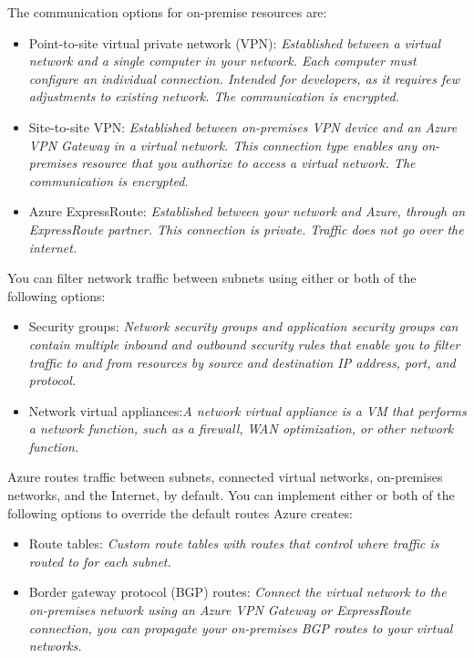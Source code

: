 The communication options for on-premise resources are:
\begin{itemize}
\item Point-to-site virtual private network (VPN): \textit{Established between a virtual network and a single computer in your network. Each computer must configure an individual connection. Intended for developers, as it requires few adjustments to existing network. The communication is encrypted.}
\item Site-to-site VPN: \textit{Established between on-premises VPN device and an Azure VPN Gateway in a virtual network. This connection type enables any on-premises resource that you authorize to access a virtual network. The communication is encrypted.}
\item Azure ExpressRoute: \textit{Established between your network and Azure, through an ExpressRoute partner. This connection is private. Traffic does not go over the internet.}
\end{itemize}

You can filter network traffic between subnets using either or both of the following options:
\begin{itemize}
\item Security groups: \textit{Network security groups and application security groups can contain multiple inbound and outbound security rules that enable you to filter traffic to and from resources by source and destination IP address, port, and protocol.}
\item Network virtual appliances:\textit{A network virtual appliance is a VM that performs a network function, such as a firewall, WAN optimization, or other network function.}
\end{itemize}

Azure routes traffic between subnets, connected virtual networks, on-premises networks, and the Internet, by default. You can implement either or both of the following options to override the default routes Azure creates:
\begin{itemize}
\item Route tables: \textit{Custom route tables with routes that control where traffic is routed to for each subnet.}
\item Border gateway protocol (BGP) routes: \textit{Connect the virtual network to the on-premises network using an Azure VPN Gateway or ExpressRoute connection, you can propagate your on-premises BGP routes to your virtual networks. }
\end{itemize}

